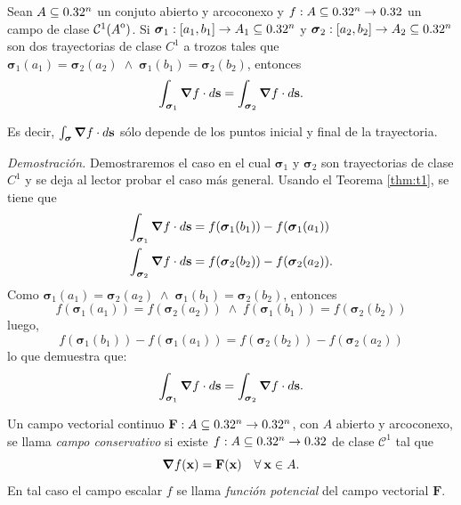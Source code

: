 \begin{corollary}\label{tmh:c1}
    Sean $A\subseteq0.32^n$ un conjuto abierto y arcoconexo y  $f:A\subseteq0.32^n\to0.32$ un campo de clase $\mathcal{C}^1({\kern0ptA}^{\mathrm{o}})$.  Si  $\boldsymbol{\sigma}_1:[a_1,b_1]\to A_1\subseteq0.32^n$ y $\boldsymbol{\sigma}_2:[a_2,b_2]\to A_2\subseteq0.32^n$ son dos trayectorias  de clase $C^{1}$ a trozos tales que $\boldsymbol{\sigma}_1(a_1)=\boldsymbol{\sigma}_2(a_2)\;\land\;\boldsymbol{\sigma}_1(b_1)=\boldsymbol{\sigma}_2(b_2)$, entonces
    \[
    \int_{\boldsymbol{\sigma}_1}\grad f\cdot d\mathbf{s}=\int_{\boldsymbol{\sigma}_2}\grad f\cdot d\mathbf{s}.
    \]
    
 Es decir,  $\int_{\boldsymbol{\sigma}}\grad f\cdot d\mathbf{s}$  s\'olo depende de los puntos inicial y final de la trayectoria.

\textit{Demostración.}  Demostraremos el caso en el cual $\boldsymbol{\sigma}_1$ y $\boldsymbol{\sigma}_2$    son trayectorias de clase $C^{1}$ y se deja al lector probar el caso m\'as general.  Usando el Teorema \ref{thm:t1}, se tiene que
\begin{align*}
    \int_{\boldsymbol{\sigma}_1}\grad f\cdot d\mathbf{s}&=f(\boldsymbol{\sigma}_1(b_1))-f(\boldsymbol{\sigma}_1(a_1))\\
    \int_{\boldsymbol{\sigma}_2}\grad f\cdot d\mathbf{s}&=f(\boldsymbol{\sigma}_2(b_2))-f(\boldsymbol{\sigma}_2(a_2)).
\end{align*}
Como $\boldsymbol{\sigma}_1(a_1)=\boldsymbol{\sigma}_2(a_2)\;\land\;\boldsymbol{\sigma}_1(b_1)=\boldsymbol{\sigma}_2(b_2)$, entonces
\begin{equation*}
    f(\boldsymbol{\sigma}_1(a_1))=f(\boldsymbol{\sigma}_2(a_2))\;\land\;f(\boldsymbol{\sigma}_1(b_1))=f(\boldsymbol{\sigma}_2(b_2))
\end{equation*}
luego,
\begin{equation*}
    f(\boldsymbol{\sigma}_1(b_1))-f(\boldsymbol{\sigma}_1(a_1))=f(\boldsymbol{\sigma}_2(b_2))-f(\boldsymbol{\sigma}_2(a_2)) 
\end{equation*}
lo que demuestra que:
\begin{equation*}
    \int_{\boldsymbol{\sigma}_1}\grad f\cdot d\mathbf{s}=\int_{\boldsymbol{\sigma}_2}\grad f\cdot d\mathbf{s}.
\end{equation*}
\end{corollary}


\begin{definition}\label{conser} Un  campo vectorial continuo $\mathbf{F}:A\subseteq0.32^n\to0.32^n$, con  $A$ abierto y arcoconexo,   se llama \emph{campo conservativo} si existe  $f:A\subseteq0.32^n\to0.32$ de clase $\mathcal{C}^1$  tal que  $$\grad f(\mathbf{x})=\mathbf{F}(\mathbf{x})\quad\forall\:\mathbf{x}\in A.$$ En tal caso el campo escalar $f$ se llama \emph{funci\'on potencial} del campo vectorial $\mathbf{F}.$
\end{definition} 

